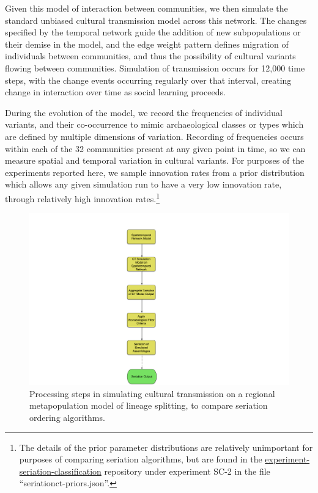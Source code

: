 \documentclass[graybox,natbib]{svmult}
\begin{document}
Given this model of interaction between communities, we then simulate
the standard unbiased cultural transmission model across this network.
The changes specified by the temporal network guide the addition of new
subpopulations or their demise in the model, and the edge weight pattern
defines migration of individuals between communities, and thus the
possibility of cultural variants flowing between communities. Simulation
of transmission occurs for 12,000 time steps, with the change events
occurring regularly over that interval, creating change in interaction
over time as social learning proceeds.

During the evolution of the model, we record the frequencies of
individual variants, and their co-occurrence to mimic archaeological
classes or types which are defined by multiple dimensions of variation.
Recording of frequencies occurs within each of the 32 communities
present at any given point in time, so we can measure spatial and
temporal variation in cultural variants. For purposes of the experiments
reported here, we sample innovation rates from a prior distribution
which allows any given simulation run to have a very low innovation
rate, through relatively high innovation rates.\footnote{The details of
  the prior parameter distributions are relatively unimportant for
  purposes of comparing seriation algorithms, but are found in the
  \href{https://github.com/mmadsen/experiment-seriation-classification}{experiment-seriation-classification}
  repository under experiment SC-2 in the file
  ``seriationct-priors.json''.}

\begin{figure}[ht]
\centering
\includegraphics[scale=0.4]{seriationct-high-level-flow.pdf}
\caption{Processing steps in simulating cultural transmission on a regional metapopulation model of lineage splitting, to compare seriation ordering algorithms.}
\label{img:seriationct-flow}
\end{figure}
\end{document}
